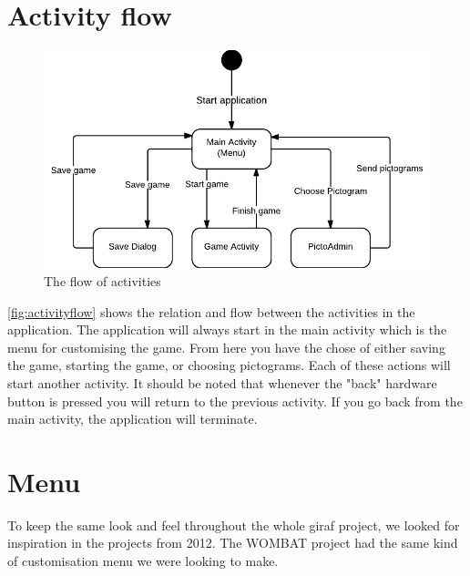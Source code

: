 \section{Activity flow}
\begin{figure}[H]
\centering
\includegraphics[width=0.9\linewidth]{img/activityflow.pdf}
\caption{The flow of activities}
\label{fig:activityflow}
\end{figure}
\autoref{fig:activityflow} shows the relation and flow between the activities in the application.
The application will always start in the main activity which is the menu for customising the game. From here you have the chose of either saving the game, starting the game, or choosing pictograms. Each of these actions will start another activity.
It should be noted that whenever the "back" hardware button is pressed you will return to the previous activity. If you go back from the main activity, the application will terminate.

\section{Menu}
To keep the same look and feel throughout the whole \ac{giraf} project, we looked for inspiration in the projects from 2012. The WOMBAT  project had the same kind of customisation menu we were looking to make.


